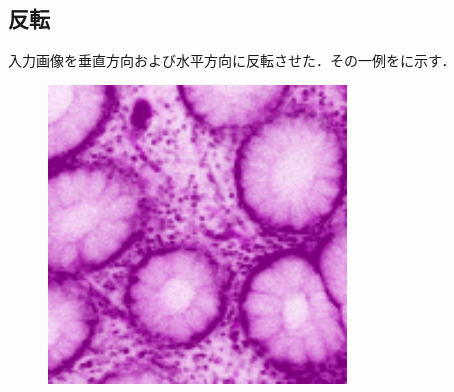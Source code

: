 \subsection*{反転}
入力画像を垂直方向および水平方向に反転させた．その一例をに示す．

\begin{figure}[H]
	\centering
	
	\begin{minipage}{0.25\columnwidth}
		\centering
		\includegraphics[clip, width=\linewidth]{fig/preprocessing/data_aug/horizontal_flip/horizontal_flip}
	\end{minipage}
	\begin{minipage}{0.1\columnwidth}
		\hspace{2truemm}
	\end{minipage}
	\begin{minipage}{0.25\columnwidth}
		\centering

\end{minipage}
\end{figure}
